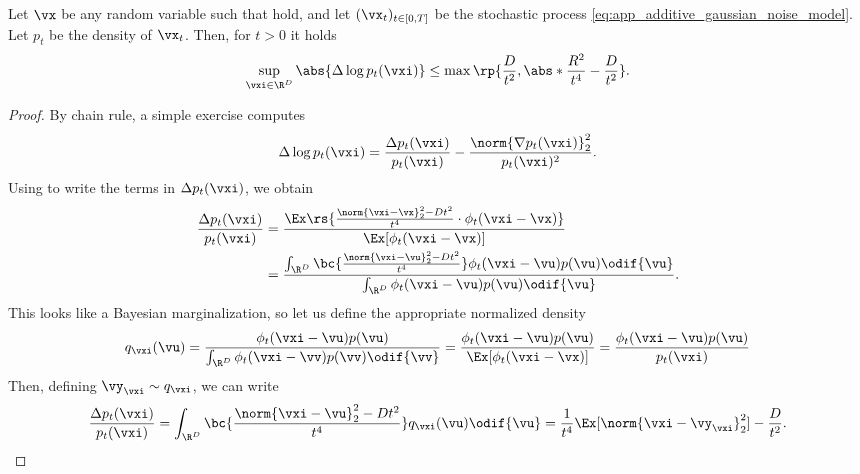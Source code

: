 \documentclass[../../book-main.tex]{subfiles}
\begin{document}
\begin{lemma}\label{lem:app_diffusion_laplacian_control}
    Let \(\vx\) be any random variable such that
    hold, and let \((\vx_{t})_{t \in [0, T]}\) be the stochastic
    process \eqref{eq:app_additive_gaussian_noise_model}. Let
    \(p_{t}\) be the density of \(\vx_{t}\). Then, for \(t > 0\) it holds
    \begin{equation}
        \sup_{\vxi \in \R^{D}}\abs{\Delta \log p_{t}(\vxi)} \leq
        \max\rp{\frac{D}{t^{2}}, \abs*{\frac{R^{2}}{t^{4}} - \frac{D}{t^{2}}}}.
    \end{equation}
\end{lemma}
\begin{proof}
    By chain rule, a simple exercise computes
    \begin{equation}
        \Delta \log p_{t}(\vxi) = \frac{\Delta
        p_{t}(\vxi)}{p_{t}(\vxi)} - \frac{\norm{\nabla
        p_{t}(\vxi)}_{2}^{2}}{p_{t}(\vxi)^{2}}.
    \end{equation}
    Using  to write the terms in \(\Delta
    p_{t}(\vxi)\), we obtain
    \begin{align}
        \frac{\Delta p_{t}(\vxi)}{p_{t}(\vxi)}
        &= \frac{\Ex\rs{\frac{\norm{\vxi - \vx}_{2}^{2} -
        Dt^{2}}{t^{4}} \cdot \phi_{t}(\vxi - \vx)}}{\Ex[\phi_{t}(\vxi
        - \vx)]} \\
        &= \frac{\int_{\R^{D}}\bc{\frac{\norm{\vxi - \vu}_{2}^{2} -
            Dt^{2}}{t^{4}}}\phi_{t}(\vxi -
        \vu)p(\vu)\odif{\vu}}{\int_{\R^{D}}\phi_{t}(\vxi -
        \vu)p(\vu)\odif{\vu}}.
    \end{align}
    This looks like a Bayesian marginalization, so let us define the
    appropriate normalized density
    \begin{equation}
        q_{\vxi}(\vu) = \frac{\phi_{t}(\vxi -
        \vu)p(\vu)}{\int_{\R^{D}}\phi_{t}(\vxi -
        \vv)p(\vv)\odif{\vv}} = \frac{\phi_{t}(\vxi -
        \vu)p(\vu)}{\Ex[\phi_{t}(\vxi - \vx)]} = \frac{\phi_{t}(\vxi
        - \vu)p(\vu)}{p_{t}(\vxi)}
    \end{equation}
    Then, defining \(\vy_{\vxi} \sim q_{\vxi}\), we can write
    \begin{equation}
        \frac{\Delta p_{t}(\vxi)}{p_{t}(\vxi)} =
        \int_{\R^{D}}\bc{\frac{\norm{\vxi - \vu}_{2}^{2} -
        Dt^{2}}{t^{4}}}q_{\vxi}(\vu)\odif{\vu} =
        \frac{1}{t^{4}}\Ex[\norm{\vxi - \vy_{\vxi}}_{2}^{2}] - \frac{D}{t^{2}}.
    \end{equation}

\end{proof}
\end{document}
